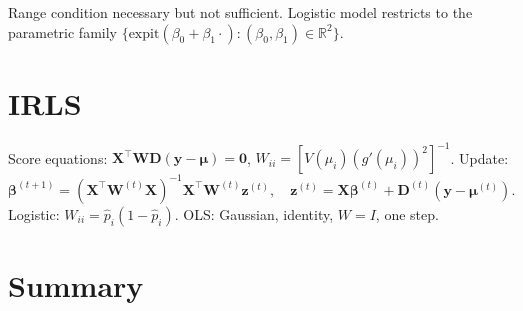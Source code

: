 \documentclass[12pt, a4paper]{article}
\theoremstyle{definition}
\newcommand{\R}{\mathbb{R}}
\newcommand{\expit}{\mathrm{expit}}
\begin{document}
Range condition necessary but not sufficient.
Logistic model restricts to the parametric family
$\{\expit(\beta_0+\beta_1\cdot):(\beta_0,\beta_1)\in\R^2\}$.

\section{IRLS}

Score equations: $\mathbf{X}^\top\mathbf{W}\mathbf{D}
(\mathbf{y}-\boldsymbol\mu)=\mathbf{0}$,
$W_{ii}=[V(\mu_i)(g'(\mu_i))^2]^{-1}$.  Update:
\[
  \boldsymbol\beta^{(t+1)}
  =(\mathbf{X}^\top\mathbf{W}^{(t)}\mathbf{X})^{-1}
   \mathbf{X}^\top\mathbf{W}^{(t)}\mathbf{z}^{(t)},
  \quad
  \mathbf{z}^{(t)}=\mathbf{X}\boldsymbol\beta^{(t)}
    +\mathbf{D}^{(t)}(\mathbf{y}-\boldsymbol\mu^{(t)}).
\]
Logistic: $W_{ii}=\hat p_i(1-\hat p_i)$.
OLS: Gaussian, identity, $W=I$, one step.

\section{Summary}
\end{document}
